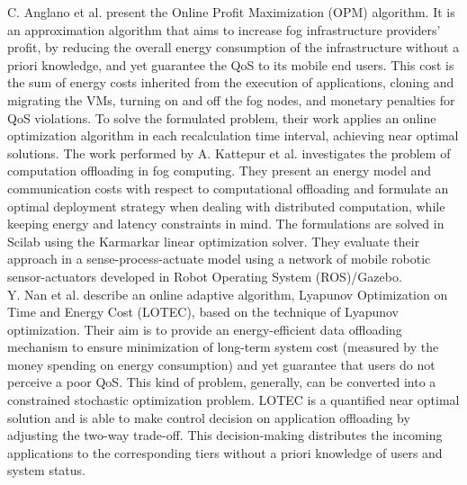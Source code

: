 \noindent\tab C. Anglano et al. \cite{anglano2018profit} present the Online Profit Maximization (OPM) algorithm. It is an approximation algorithm that aims to increase fog infrastructure providers' profit, by reducing the overall energy consumption of the infrastructure without a priori knowledge, and yet guarantee the QoS to its mobile end users. This cost is the sum of energy costs inherited from the execution of applications, cloning and migrating the VMs, turning on and off the fog nodes, and monetary penalties for QoS violations. To solve the formulated problem, their work applies an online optimization algorithm in each recalculation time interval, achieving near optimal solutions.
\noindent\tab The work performed by A. Kattepur et al. \cite{kattepur2016resource} investigates the problem of computation offloading in fog computing. They present an energy model and communication costs with respect to computational offloading and formulate an optimal deployment strategy when dealing with distributed computation, while keeping energy and latency constraints in mind. The formulations are solved in Scilab using the Karmarkar linear optimization solver. They evaluate their approach in a sense-process-actuate model using a network of mobile robotic sensor-actuators developed in Robot Operating System (ROS)/Gazebo.\\
\noindent\tab Y. Nan et al. \cite{nan2017adaptive} describe an online adaptive algorithm, Lyapunov Optimization on Time and Energy Cost (LOTEC), based on the technique of Lyapunov optimization. Their aim is to provide an energy-efficient data offloading mechanism to ensure minimization of long-term system cost (measured by the money spending on energy consumption) and yet guarantee that users do not perceive a poor QoS. This kind of problem, generally, can be converted into a constrained stochastic optimization problem. LOTEC is a quantified near optimal solution and is able to make control decision on application offloading by adjusting the two-way trade-off. This decision-making distributes the incoming applications to the corresponding tiers without a priori knowledge of users and system status.

